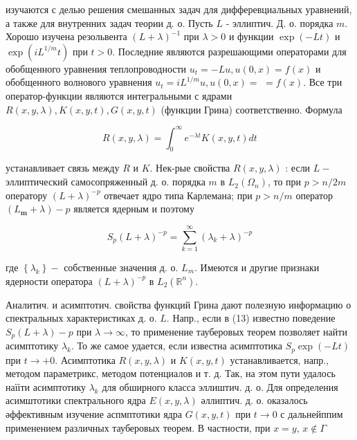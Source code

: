 \documentclass[10pt]{article}
\begin{document}
изучаются с делью решения смешанных задач для дифферевциальных уравнений, а также для внутренних задач теории д. о. Пусть $L$ - эллиптич. Д. о. порядка $m$. Хорошо изучена резольвента $(L+\lambda)^{-1}$ при $\lambda>0$ и функции $\exp (-L t)$ и $\exp \left(i L^{1 / m} t\right)$ при $t>0$. Последние являются разрешающими операторами для обобщенного уравнения теплопроводности $u_{t}=-L u, u(0, x)=f(x)$ и обобщенного волнового уравнения $u_{t}=i L^{1 / m} u, u(0, x)=$ $=f(x)$. Все три оператор-функции являются интегральными с ядрами $R(x, y, \lambda), K(x, y, t), G(x, y, t)$ (функции Грина) соответственно. Формула



\[

R(x, y, \lambda)=\int_{0}^{\infty} e^{-\lambda t} K(x, y, t) d t

\]



устанавливает связь между $R$ и $K$. Нек-рые свойства $R(x, y, \lambda)$ : если $L-$ эллиптический самосопряженный д. о. порядка $m$ в $L_{2}\left(\Omega_{n}\right)$, то при $p>n / 2 m$ оператору $(L+\lambda)^{-p}$ отвечает ядро типа Карлемана; при $p>n / m$ оператор $\left(L_{\boldsymbol{m}}+\lambda\right)-p$ является ядерным и поэтому



\[

S_{p}(L+\lambda)^{-p}=\sum_{k=1}^{\infty}\left(\lambda_{k}+\lambda\right)^{-p}

\]



где $\left\{\lambda_{k}\right\}-$ собственные значения д. о. $L_{m}$. Имеются и другие признаки ядерности оператора $(L+\lambda)^{-p}$ в $L_{2}\left(\mathbb{R}^{n}\right)$.



Аналитич. и асимптотич. свойства функций Грина дают полезную информацию о спектральных характеристиках д. о. $L$. Напр., если в (13) известно поведение $S_{p}(L+\lambda)-p$ при $\lambda \rightarrow \infty$, то применение тауберовых теорем позволяет найти асимптотику $\lambda_{k}$. То же самое удается, если известна асимптотика $S_{p} \exp (-L t)$ при $t \rightarrow+0$. Асимптотика $R(x, y, \lambda)$ и $K(x, y, t)$ устанавливается, напр., методом параметрикс, методом потенциалов и т. д. Так, на этом пути удалось наїіти асимптотику $\lambda_{k}$ для обширного класса эллиштич. д. о. Для определения асимштотики спектрального ядра $E(x, y, \lambda)$ әллиптич. д. о. оказалось әффективным изучение аспмптотики ядра $G(x, y, t)$ при $t \rightarrow 0$ с дальнейппим применением различных тауберовых теорем. В частности, при $x=y$, $x \notin \Gamma$
\end{document}
